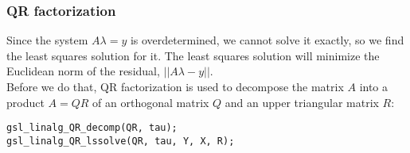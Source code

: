 \documentclass[11pt, a4paper, titlepage, openright]{article}
\begin{document}
\subsubsection{QR factorization}
    Since the system \(A \lambda = y \) is overdetermined, we cannot solve it exactly, so we find the least squares solution for it.
    The least squares solution will minimize the Euclidean norm of the residual, \(||A\lambda - y||\). \\
    Before we do that, QR factorization is used to decompose the matrix \( A \) into a product \( A = QR \)
    of an orthogonal matrix \(Q\) and an upper triangular matrix \(R\):
\begin{lstlisting}
gsl_linalg_QR_decomp(QR, tau);
gsl_linalg_QR_lssolve(QR, tau, Y, X, R);
\end{lstlisting}
\end{document}
